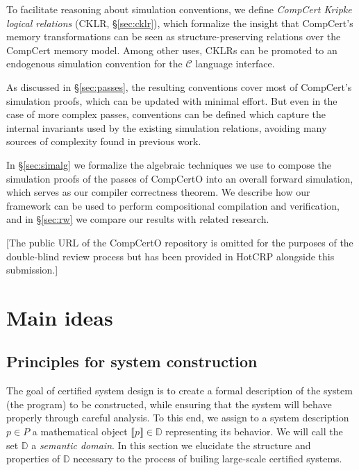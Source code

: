 \documentclass[sigplan,10pt,review,anonymous]{acmart}
\begin{document}
To facilitate reasoning about
simulation conventions,
we define \emph{CompCert Kripke logical relations}
(CKLR, \S\ref{sec:cklr}),
which formalize the insight that
CompCert's memory transformations can be seen
as structure-preserving relations
over the CompCert memory model.
Among other uses,
CKLRs can be promoted to an endogenous
simulation convention for the $\mathcal{C}$
language interface.

As discussed in \S\ref{sec:passes},
the resulting conventions
cover most of CompCert's simulation proofs,
which can be updated with minimal effort.
But even in the case of more complex passes,
conventions can be defined
which capture the internal invariants
used by the existing simulation relations,
avoiding many sources of complexity found
in previous work.

In \S\ref{sec:simalg} we formalize the algebraic techniques
we use to compose the simulation proofs of the passes of CompCertO
into an overall forward simulation,
which serves as our compiler correctness theorem.
We describe how our framework
can be used to perform compositional compilation and verification,
and in \S\ref{sec:rw} we compare our results with related research.

[The public URL of the CompCertO repository is omitted
for the purposes of the double-blind review process
but has been provided in HotCRP alongside this submission.]



\section{Main ideas} \label{sec:mainideas} %

\subsection{Principles for system construction} \label{sec:principles} %


The goal of certified system design is
to create a formal description of
the system (the program) to be constructed,
while ensuring
that the system
will behave properly
through careful analysis.
To this end,
we assign
to a system description $p \in P$
a mathematical object $\llbracket p \rrbracket \in \mathbb{D}$
representing its behavior.
We will call the set $\mathbb{D}$ a \emph{semantic domain}.
In this section we elucidate
the structure and properties of $\mathbb{D}$
necessary to the process of builing
large-scale certified systems.
\end{document}
